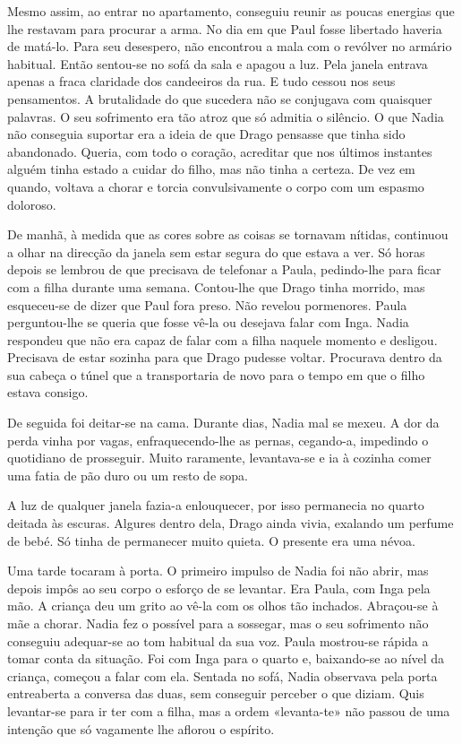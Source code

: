 Mesmo assim, ao entrar no apartamento, conseguiu
reunir as poucas energias que lhe restavam para procurar a arma. No dia
em que Paul fosse libertado haveria de matá-lo. Para seu desespero, não
encontrou a mala com o
revólver no armário habitual. Então sentou-se no sofá da sala e apagou a
luz. Pela janela entrava apenas a fraca claridade dos candeeiros da rua.
E tudo cessou nos seus pensamentos. A brutalidade do que sucedera não se
conjugava com quaisquer palavras. O seu sofrimento era tão atroz que
só admitia o silêncio. O que Nadia não conseguia suportar era a ideia
de que Drago pensasse que tinha sido abandonado. Queria, com todo o
coração, acreditar que nos últimos instantes alguém tinha estado a
cuidar do filho, mas não tinha a certeza. De vez em quando, voltava a
chorar e torcia convulsivamente o corpo com um espasmo doloroso.

De manhã, à medida que as cores sobre as coisas se tornavam nítidas,
continuou a olhar na direcção da janela sem estar segura do que estava a
ver. Só horas depois se lembrou de que precisava de telefonar a Paula,
pedindo-lhe para ficar com a filha durante uma semana. Contou-lhe que
Drago tinha morrido, mas esqueceu-se de dizer que Paul fora preso. Não
revelou pormenores. Paula perguntou-lhe se queria que fosse vê-la ou desejava falar com Inga. Nadia
respondeu que não era capaz de falar com a filha naquele momento e
desligou. Precisava de estar sozinha para que Drago pudesse voltar.
Procurava dentro da sua cabeça o túnel que a transportaria de novo para
o tempo em que o filho estava consigo.

De seguida foi deitar-se na cama. Durante dias, Nadia mal se mexeu. A
dor da perda vinha por vagas, enfraquecendo-lhe as pernas, cegando-a,
impedindo o quotidiano de prosseguir. Muito raramente, levantava-se e
ia à cozinha comer uma fatia de pão duro ou um resto de sopa.

A luz de qualquer janela fazia-a enlouquecer, por isso permanecia no
quarto deitada às escuras. Algures dentro dela, Drago ainda vivia,
exalando um perfume de bebé. Só tinha de permanecer muito quieta. O
presente era uma névoa.

Uma tarde tocaram à porta. O primeiro impulso de Nadia foi não abrir,
mas depois impôs ao seu corpo o esforço de se levantar. Era Paula, com
Inga pela mão. A criança deu um grito ao vê-la com os olhos tão
inchados. Abraçou-se à mãe a chorar. Nadia fez o possível para a
sossegar, mas o seu sofrimento não conseguiu adequar-se ao tom habitual
da sua voz. Paula mostrou-se rápida a tomar conta da situação. Foi com
Inga para o quarto e, baixando-se ao nível da criança, começou a falar com ela. Sentada no sofá, Nadia
observava pela porta entreaberta a conversa das duas, sem conseguir
perceber o que diziam. Quis levantar-se para ir ter com a filha, mas a
ordem «levanta-te» não passou de uma intenção que só vagamente lhe
aflorou o espírito.

